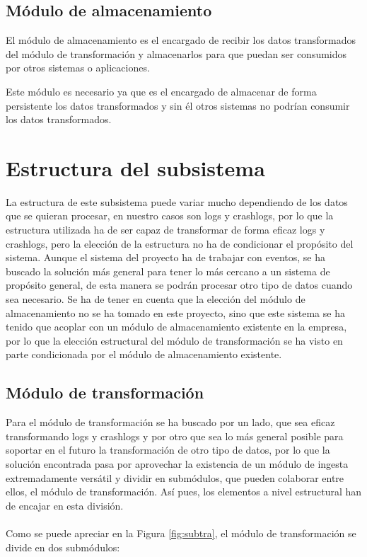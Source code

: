\subsection{Módulo de almacenamiento}

El módulo de almacenamiento es el encargado de recibir los datos transformados del módulo de transformación y almacenarlos para que puedan ser consumidos por otros sistemas o aplicaciones.

Este módulo es necesario ya que es el encargado de almacenar de forma persistente los datos transformados y sin él otros sistemas no podrían consumir los datos transformados.


\section{Estructura del subsistema}

La estructura de este subsistema puede variar mucho dependiendo de los datos que se quieran procesar, en nuestro casos son logs y crashlogs, por lo que la estructura utilizada ha de ser capaz de transformar de forma eficaz logs y crashlogs, pero la elección de la estructura no ha de condicionar el propósito del sistema. Aunque el sistema del proyecto ha de trabajar con eventos, se ha buscado la solución más general para tener lo más cercano a un sistema de propósito general, de esta manera se podrán procesar otro tipo de datos cuando sea necesario. Se ha de tener en cuenta que la elección del módulo de almacenamiento no se ha tomado en este proyecto, sino que este sistema se ha tenido que acoplar con un módulo de almacenamiento existente en la empresa, por lo que la elección estructural del módulo de transformación se ha visto en parte condicionada por el módulo de almacenamiento existente.


\subsection{Módulo de transformación}

Para el módulo de transformación se ha buscado por un lado, que sea eficaz transformando logs y crashlogs y por otro que sea lo más general posible para soportar en el futuro la transformación de otro tipo de datos, por lo que la solución encontrada pasa por aprovechar la existencia de un módulo de ingesta extremadamente versátil y dividir en submódulos, que pueden colaborar entre ellos, el módulo de transformación. Así pues, los elementos a nivel estructural han de encajar en esta división.
\\\\
Como se puede apreciar en la Figura \ref{fig:subtra}, el módulo de transformación se divide en dos submódulos:

